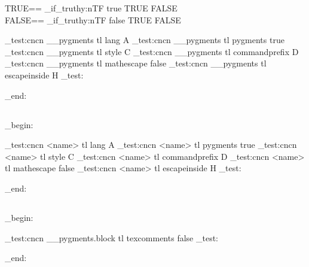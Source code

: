 TRUE==
\CDR_if_truthy:nTF { true } {
  TRUE
} {
  FALSE
}\\
FALSE==
\CDR_if_truthy:nTF { false } {
  TRUE
} {
  FALSE
}\\


\CDR_test:cncn { __pygments } { tl } { lang } { A }
\CDR_test:cncn { __pygments } { tl } { pygments } { true }
\CDR_test:cncn { __pygments } { tl } { style } { C }
\CDR_test:cncn { __pygments } { tl } { commandprefix } { D }
\CDR_test:cncn { __pygments } { tl } { mathescape } { false }
\CDR_test:cncn { __pygments } { tl } { escapeinside } { H }
\CDR_test:

\group_end:
\ExplSyntaxOff

\subsection{}
\ExplSyntaxOn
\group_begin:
{}

\CDR_test:cncn { <name> } { tl } { lang } { A }
\CDR_test:cncn { <name> } { tl } { pygments } { true }
\CDR_test:cncn { <name> } { tl } { style } { C }
\CDR_test:cncn { <name> } { tl } { commandprefix } { D }
\CDR_test:cncn { <name> } { tl } { mathescape } { false }
\CDR_test:cncn { <name> } { tl } { escapeinside } { H }
\CDR_test:

\group_end:
\ExplSyntaxOff

\subsection{}
\ExplSyntaxOn
\group_begin:


\CDR_test:cncn { __pygments.block } { tl } { texcomments} { false }
\CDR_test:

\group_end:
\ExplSyntaxOff

\subsection{}

